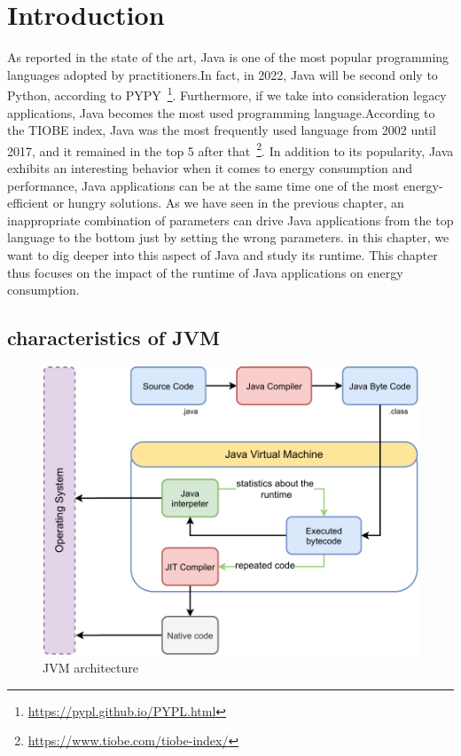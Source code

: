 \section{Introduction}
As reported in the state of the art, Java is one of the most popular programming languages adopted by practitioners.In fact, in 2022, Java will be second only to Python, according to PYPY~\footnote{\url{https://pypl.github.io/PYPL.html}}.
Furthermore, if we take into consideration legacy applications, Java becomes the most used programming language.According to the TIOBE index, Java was the most frequently used language from 2002 until 2017, and it remained in the top 5 after that~\footnote{\url{https://www.tiobe.com/tiobe-index/}}.
In addition to its popularity, Java exhibits an interesting behavior when it comes to energy consumption and performance, Java applications can be at the same time one of the most energy-efficient or hungry solutions.
As we have seen in the previous chapter, an inappropriate combination of parameters can drive Java applications from the top language to the bottom just by setting the wrong parameters.
in this chapter, we want to dig deeper into this aspect of Java and study its runtime.
This chapter thus focuses on the impact of the runtime of Java applications on energy consumption.

\subsection{characteristics of JVM}
\begin{figure}%
    \centering
    \includegraphics[width=\linewidth]{imgs/Jvm_architecture}
    \caption{JVM architecture}
    \label{fig:JVM_architecture}
\end{figure}

